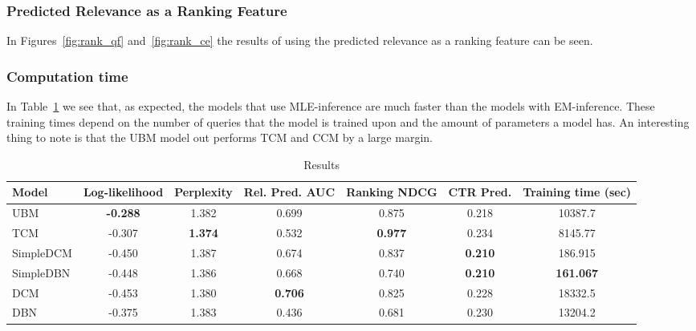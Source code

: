 \subsubsection{Predicted Relevance as a Ranking Feature}
In Figures~\ref{fig:rank_qf} and~\ref{fig:rank_ce} the results of using the predicted relevance as a ranking feature can be seen.

\subsubsection{Computation time}
In Table~\ref{table:results} we see that, as expected, the models that use MLE-inference are much faster than the models with EM-inference. These training times depend on the number of queries that the model is trained upon and the amount of parameters a model has. An interesting thing to note is that the UBM model out performs TCM and CCM by a large margin.



\begin{table}[h]
	\centering
	\begin{tabular}{@{}lcccccc@{}}
		\toprule
		Model     & Log-likelihood  & Perplexity	 & Rel. Pred. AUC		 & Ranking NDCG      & CTR Pred.		 & Training time (sec) \\ \midrule
		UBM       & \textbf{-0.288} & 1.382          & 0.699                 & 0.875			 & 0.218			 & 10387.7                 \\
		TCM       & -0.307          & \textbf{1.374} & 0.532                 & \textbf{0.977}	 & 0.234			 & 8145.77                 \\
		SimpleDCM & -0.450          & 1.387          & 0.674                 & 0.837             & \textbf{0.210}	 & 186.915                 \\
		SimpleDBN & -0.448          & 1.386          & 0.668                 & 0.740             & \textbf{0.210}	 & \textbf{161.067}        \\
		DCM       & -0.453          & 1.380          & \textbf{0.706}        & 0.825			 & 0.228			 & 18332.5                 \\
		DBN       & -0.375          & 1.383          & 0.436                 & 0.681			 & 0.230			 & 13204.2                 \\ \bottomrule
	\end{tabular}
	\caption{Results}
	\label{table:results}
\end{table}
